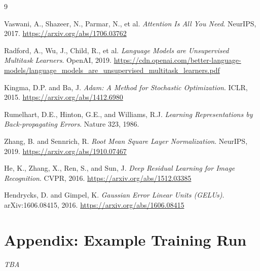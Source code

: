 \documentclass[11pt,a4paper]{article}
\begin{document}
\begin{thebibliography}{9}

Vaswani, A., Shazeer, N., Parmar, N., et al.
\textit{Attention Is All You Need}. NeurIPS, 2017.
\url{https://arxiv.org/abs/1706.03762}

Radford, A., Wu, J., Child, R., et al.
\textit{Language Models are Unsupervised Multitask Learners}. OpenAI, 2019.
\url{https://cdn.openai.com/better-language-models/language_models_are_unsupervised_multitask_learners.pdf}

Kingma, D.P. and Ba, J.
\textit{Adam: A Method for Stochastic Optimization}. ICLR, 2015.
\url{https://arxiv.org/abs/1412.6980}

Rumelhart, D.E., Hinton, G.E., and Williams, R.J.
\textit{Learning Representations by Back-propagating Errors}. Nature 323, 1986.

Zhang, B. and Sennrich, R.
\textit{Root Mean Square Layer Normalization}. NeurIPS, 2019.
\url{https://arxiv.org/abs/1910.07467}

He, K., Zhang, X., Ren, S., and Sun, J.
\textit{Deep Residual Learning for Image Recognition}. CVPR, 2016.
\url{https://arxiv.org/abs/1512.03385}

Hendrycks, D. and Gimpel, K.
\textit{Gaussian Error Linear Units (GELUs)}. arXiv:1606.08415, 2016.
\url{https://arxiv.org/abs/1606.08415}

\end{thebibliography}

\newpage
\section*{Appendix: Example Training Run}

\textit{TBA}
\end{document}
